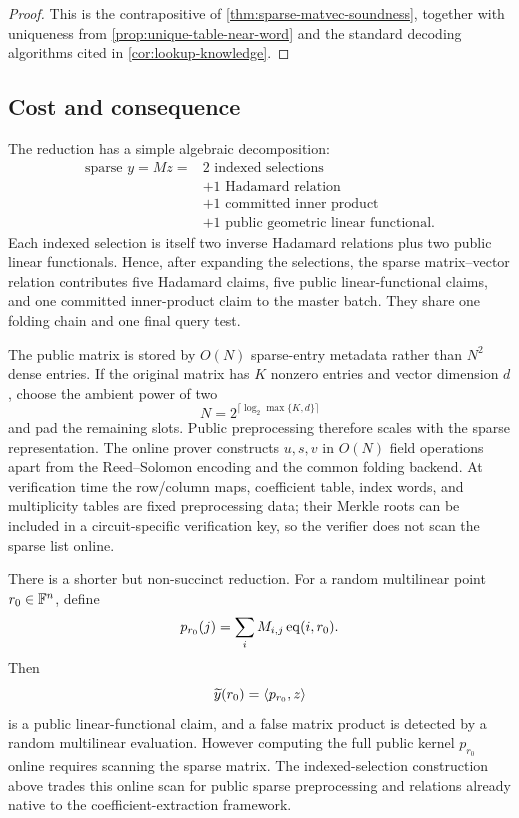 \begin{proof}
This is the contrapositive of \cref{thm:sparse-matvec-soundness}, together with uniqueness from \cref{prop:unique-table-near-word} and the standard decoding algorithms cited in \cref{cor:lookup-knowledge}.
\end{proof}

\subsection{Cost and consequence}
\label{sec:sparse-matvec-cost}

The reduction has a simple algebraic decomposition:
\begin{equation}
\begin{aligned}
  \text{sparse }y=Mz
  ={}&2\text{ indexed selections}\\
     &+1\text{ Hadamard relation}\\
     &+1\text{ committed inner product}\\
     &+1\text{ public geometric linear functional}.
\end{aligned}
\label{eq:sparse-matvec-decomposition}
\end{equation}
Each indexed selection is itself two inverse Hadamard relations plus two public linear functionals.  Hence, after expanding the selections, the sparse matrix--vector relation contributes five Hadamard claims, five public linear-functional claims, and one committed inner-product claim to the master batch.  They share one folding chain and one final query test.

The public matrix is stored by $O(N)$ sparse-entry metadata rather than $N^2$ dense entries.  If the original matrix has $K$ nonzero entries and vector dimension $d$, choose the ambient power of two
\begin{equation}
  N=2^{\lceil\log_2\max\{K,d\}\rceil}
  \label{eq:sparse-ambient-choice}
\end{equation}
and pad the remaining slots.  Public preprocessing therefore scales with the sparse representation.  The online prover constructs $u,s,v$ in $O(N)$ field operations apart from the Reed--Solomon encoding and the common folding backend.  At verification time the row/column maps, coefficient table, index words, and multiplicity tables are fixed preprocessing data; their Merkle roots can be included in a circuit-specific verification key, so the verifier does not scan the sparse list online.

\begin{remark}
\label{rem:direct-sparse-compression}
There is a shorter but non-succinct reduction.  For a random multilinear point $r_0\in\mathbb{F}^n$, define
\[
  p_{r_0}(j)=\sum_i M_{i,j}\operatorname{eq}(i,r_0).
\]
Then
\[
  \widetilde y(r_0)=\left\langle p_{r_0},z\right\rangle
\]
is a public linear-functional claim, and a false matrix product is detected by a random multilinear evaluation.  However computing the full public kernel $p_{r_0}$ online requires scanning the sparse matrix.  The indexed-selection construction above trades this online scan for public sparse preprocessing and relations already native to the coefficient-extraction framework.
\end{remark}

